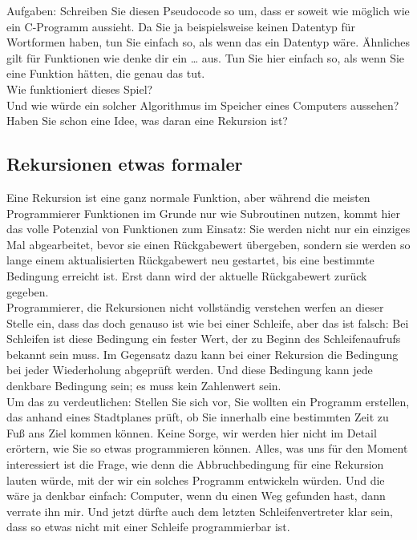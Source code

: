 Aufgaben: Schreiben Sie diesen Pseudocode so um, dass er soweit wie möglich wie ein C-Programm aussieht. Da Sie ja beispielsweise keinen Datentyp für Wortformen haben, tun Sie einfach so, als wenn das ein Datentyp wäre. Ähnliches gilt für Funktionen wie denke dir ein … aus. Tun Sie hier einfach so, als wenn Sie eine Funktion hätten, die genau das tut.\\

Wie funktioniert dieses Spiel?\\

Und wie würde ein solcher Algorithmus im Speicher eines Computers aussehen?\\

Haben Sie schon eine Idee, was daran eine Rekursion ist?

\subsection{Rekursionen etwas formaler}

Eine Rekursion ist eine ganz normale Funktion, aber während die meisten Programmierer Funktionen im Grunde nur wie Subroutinen nutzen, kommt hier das volle Potenzial von Funktionen zum Einsatz: Sie werden nicht nur ein einziges Mal abgearbeitet, bevor sie einen Rückgabewert übergeben, sondern sie werden so lange einem aktualisierten Rückgabewert neu gestartet, bis eine bestimmte Bedingung erreicht ist. Erst dann wird der aktuelle Rückgabewert zurück gegeben. \\

Programmierer, die Rekursionen nicht vollständig verstehen werfen an dieser Stelle ein, dass das doch genauso ist wie bei einer Schleife, aber das ist falsch: Bei Schleifen ist diese Bedingung ein fester Wert, der zu Beginn des Schleifenaufrufs bekannt sein muss. Im Gegensatz dazu kann bei einer Rekursion die Bedingung bei jeder Wiederholung abgeprüft werden. Und diese Bedingung kann jede denkbare Bedingung sein; es muss kein Zahlenwert sein.\\

Um das zu verdeutlichen: Stellen Sie sich vor, Sie wollten ein Programm erstellen, das anhand eines Stadtplanes prüft, ob Sie innerhalb eine bestimmten Zeit zu Fuß ans Ziel kommen können. Keine Sorge, wir werden hier nicht im Detail erörtern, wie Sie so etwas programmieren können. Alles, was uns für den Moment interessiert ist die Frage, wie denn die Abbruchbedingung für eine Rekursion lauten würde, mit der wir ein solches Programm entwickeln würden. Und die wäre ja denkbar einfach: Computer, wenn du einen Weg gefunden hast, dann verrate ihn mir. Und jetzt dürfte auch dem letzten Schleifenvertreter klar sein, dass so etwas nicht mit einer Schleife programmierbar ist.

